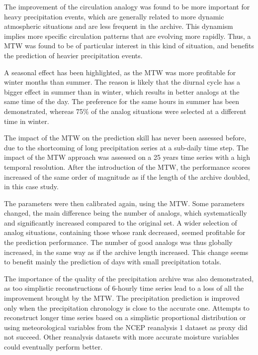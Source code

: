 \documentclass[hess, manuscript]{copernicus}
\begin{document}
The improvement of the circulation analogy was found to be more important for heavy precipitation events, which are generally related to more dynamic atmospheric situations and are less frequent in the archive. This dynamism implies more specific circulation patterns that are evolving more rapidly. Thus, a MTW was found to be of particular interest in this kind of situation, and benefits the prediction of heavier precipitation events.

A seasonal effect has been highlighted, as the MTW was more profitable for winter months than summer. The reason is likely that the diurnal cycle has a bigger effect in summer than in winter, which results in better analogs at the same time of the day. The preference for the same hours in summer has been demonstrated, whereas 75\% of the analog situations were selected at a different time in winter.

The impact of the MTW on the prediction skill has never been assessed before, due to the shortcoming of long precipitation series at a sub-daily time step. The impact of the MTW approach was assessed on a 25 years time series with a high temporal resolution. After the introduction of the MTW, the performance scores increased of the same order of magnitude as if the length of the archive doubled, in this case study.

The parameters were then calibrated again, using the MTW. Some parameters changed, the main difference being the number of analogs, which systematically and significantly increased compared to the original set. A wider selection of analog situations, containing those whose rank decreased, seemed profitable for the prediction performance. The number of good analogs was thus globally increased, in the same way as if the archive length increased. This change seems to benefit mainly the prediction of days with small precipitation totals.

The importance of the quality of the precipitation archive was also demonstrated, as too simplistic reconstructions of 6-hourly time series lead to a loss of all the improvement brought by the MTW. The precipitation prediction is improved only when the precipitation chronology is close to the accurate one. Attempts to reconstruct longer time series based on a simplistic proportional distribution or using meteorological variables from the NCEP reanalysis 1 dataset as proxy did not succeed. Other reanalysis datasets with more accurate moisture variables could eventually perform better.
\end{document}
